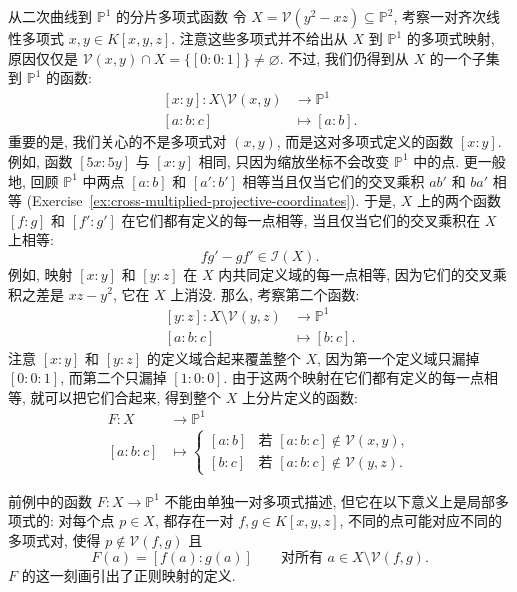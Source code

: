 \begin{Example}{从二次曲线到 $\mathbb{P}^{1}$ 的分片多项式函数}\leavevmode\label{ex:piecewise-polynomial-map-from-conic}
令 $X=\mathcal{V}(y^{2}-xz)\subseteq\mathbb{P}^{2}$, 考察一对齐次线性多项式 $x,y\in K[x,y,z]$. 注意这些多项式并不给出从 $X$ 到 $\mathbb{P}^{1}$ 的多项式映射, 原因仅仅是 $\mathcal{V}(x,y)\cap X=\{[0:0:1]\}\ne\varnothing$. 不过, 我们仍得到从 $X$ 的一个子集到 $\mathbb{P}^{1}$ 的函数:
\[
  \begin{aligned}
    [x:y]:X\setminus\mathcal{V}(x,y)&\to\mathbb{P}^{1}\\
    [a:b:c]&\mapsto[a:b].
  \end{aligned}
\]
重要的是, 我们关心的不是多项式对 $(x,y)$, 而是这对多项式定义的函数 $[x:y]$. 例如, 函数 $[5x:5y]$ 与 $[x:y]$ 相同, 只因为缩放坐标不会改变 $\mathbb{P}^{1}$ 中的点. 更一般地, 回顾 $\mathbb{P}^{1}$ 中两点 $[a:b]$ 和 $[a':b']$ 相等当且仅当它们的交叉乘积 $ab'$ 和 $ba'$ 相等 (Exercise~\ref{ex:cross-multiplied-projective-coordinates}). 于是, $X$ 上的两个函数 $[f:g]$ 和 $[f':g']$ 在它们都有定义的每一点相等, 当且仅当它们的交叉乘积在 $X$ 上相等:
\[
  fg'-gf'\in\mathcal{I}(X).
\]
例如, 映射 $[x:y]$ 和 $[y:z]$ 在 $X$ 内共同定义域的每一点相等, 因为它们的交叉乘积之差是 $xz-y^{2}$, 它在 $X$ 上消没. 那么, 考察第二个函数:
\[
  \begin{aligned}
    [y:z]:X\setminus\mathcal{V}(y,z)&\to\mathbb{P}^{1}\\
    [a:b:c]&\mapsto[b:c].
  \end{aligned}
\]
注意 $[x:y]$ 和 $[y:z]$ 的定义域合起来覆盖整个 $X$, 因为第一个定义域只漏掉 $[0:0:1]$, 而第二个只漏掉 $[1:0:0]$. 由于这两个映射在它们都有定义的每一点相等, 就可以把它们合起来, 得到整个 $X$ 上分片定义的函数:
\[
  \begin{aligned}
    F:X&\to\mathbb{P}^{1}\\
    [a:b:c]&\mapsto
    \begin{cases}
      [a:b] & \text{若 }[a:b:c]\notin\mathcal{V}(x,y),\\
      [b:c] & \text{若 }[a:b:c]\notin\mathcal{V}(y,z).
    \end{cases}
  \end{aligned}
\]
\end{Example}

前例中的函数 $F:X\to\mathbb{P}^{1}$ 不能由单独一对多项式描述, 但它在以下意义上是\textquotedbl{}局部\textquotedbl{}多项式的: 对每个点 $p\in X$, 都存在一对 $f,g\in K[x,y,z]$, 不同的点可能对应不同的多项式对, 使得 $p\notin\mathcal{V}(f,g)$ 且
\[
  F(a)=[f(a):g(a)]\qquad\text{对所有 }a\in X\setminus\mathcal{V}(f,g).
\]
$F$ 的这一刻画引出了正则映射的定义.

